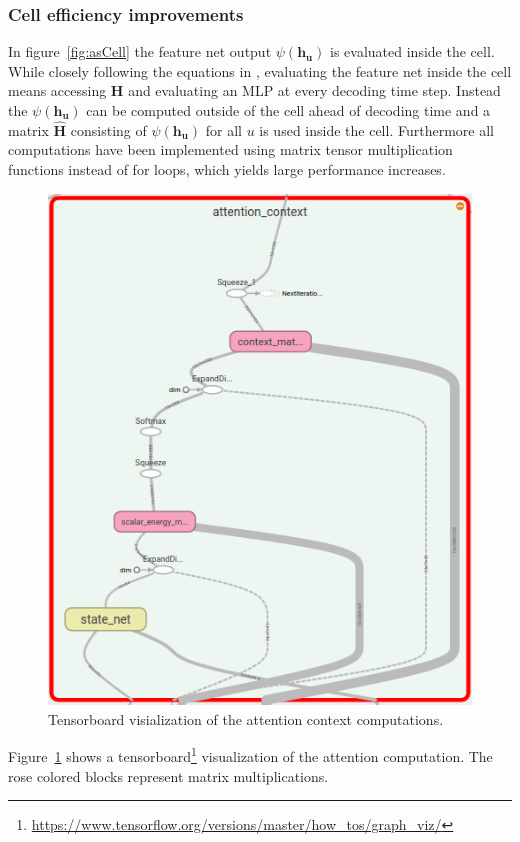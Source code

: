 \subsubsection{Cell efficiency improvements}
In figure~\ref{fig:asCell} the feature net output $\psi(\mathbf{h_u})$ is evaluated inside the cell. While closely following the equations in \cite{Chan2015}, evaluating the feature net inside the cell means accessing $\mathbf{H}$ and evaluating an MLP at every decoding time step. Instead the $\psi(\mathbf{h_u})$ can be computed outside of the cell ahead of decoding time and a matrix $\hat{\mathbf{H}}$ consisting of $\psi(\mathbf{h_u})$ for all $u$ is used inside the cell.
Furthermore all computations have been implemented using matrix tensor multiplication functions instead of for loops, which yields large performance increases. 
\begin{figure}
\centering
\includegraphics[width=0.49\linewidth]{../png/attention_context}
\caption{Tensorboard visialization of the attention context computations.}
\label{fig:attention_context}
\end{figure}
Figure~\ref*{fig:attention_context} shows a tensorboard\footnote{\url{https://www.tensorflow.org/versions/master/how_tos/graph_viz/}} visualization of the attention computation. The rose colored blocks represent matrix multiplications.

